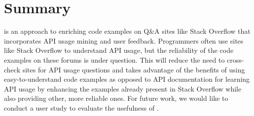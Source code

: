 \section{Summary}
\label{sec:summary}

{\soa} is an approach to enriching code examples on Q\&A sites like Stack Overflow that incorporates API usage mining and user feedback. Programmers often use sites like Stack Overflow to understand API usage, but the reliability of the code examples on these forums is under question. This will reduce the need to cross-check sites for API usage questions and takes advantage of the benefits of using easy-to-understand code examples as opposed to API documentation for learning API usage by enhancing the examples already present in Stack Overflow while also providing other, more reliable ones. For future work, we would like to conduct a user study to evaluate the usefulness of {\tool}.